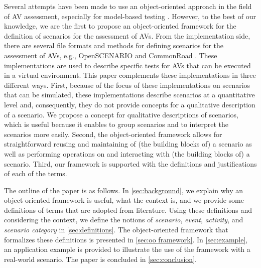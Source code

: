 \cstartb Several attempts have been made to use an object-oriented approach in the field of AV assessment, especially for model-based testing \autocite{tsai2003scenario, utting2012taxonomy, zofka2016testing, wittmann2017method}. \cendb
However, to the best of our knowledge, we are the first to propose an \cstartb object-oriented framework for the definition of \cendb scenarios for the assessment of AVs. 
From the implementation side, there are several file formats and methods for \cstartb defining scenarios for the assessment of AVs\cendb, e.g., OpenSCENARIO \autocite{openscenario} and CommonRoad \autocite{althoff2017CommonRoad}. 
\cstart These implementations are used to describe specific tests for AVs that can be executed in a virtual environment.
\cstartb This paper complements these implementations in three different ways. 
First, because of the focus of these implementations on scenarios that can be simulated, these implementations describe scenarios at a quantitative level and, consequently, they do not provide concepts for a qualitative description of a scenario. 
We propose a concept for qualitative descriptions of scenarios, which is useful because it enables to group scenarios and to interpret the scenarios more easily.
Second, the object-oriented framework allows for straightforward reusing and maintaining of (the building blocks of) a scenario as well as performing operations on and interacting with (the building blocks of) a scenario.
Third, our framework is supported with the definitions and justifications of each of the terms. \cendb

The outline of the paper is as follows. In \cref{sec:background}, we explain why an \cstartb object-oriented framework \cendb is useful, what the context is, and we provide some definitions of terms that are adopted from literature. 
Using these definitions and considering the context, we define the notions of \emph{scenario}, \emph{event}, \emph{activity}, and \emph{scenario category}  in \cref{sec:definitions}. 
The \cstartb object-oriented framework \cendb that formalizes these definitions is presented in \cref{sec:oo framework}. 
In \cref{sec:example}, an application example is provided to illustrate the use of the \cstartb framework \cendb with a real-world scenario. 
The paper is concluded in \cref{sec:conclusion}.
